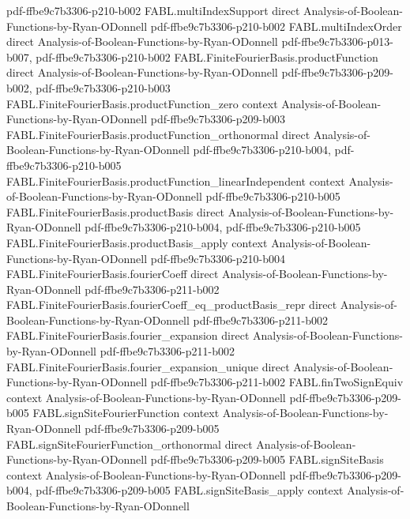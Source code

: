 \begin{theorem}
  {pdf-ffbe9c7b3306-p210-b002}
\proofstep
  {FABL.multiIndexSupport}
  {direct}
  {Analysis-of-Boolean-Functions-by-Ryan-ODonnell}
  {pdf-ffbe9c7b3306-p210-b002}
\proofstep
  {FABL.multiIndexOrder}
  {direct}
  {Analysis-of-Boolean-Functions-by-Ryan-ODonnell}
  {pdf-ffbe9c7b3306-p013-b007,
    pdf-ffbe9c7b3306-p210-b002}
\proofstep
  {FABL.FiniteFourierBasis.productFunction}
  {direct}
  {Analysis-of-Boolean-Functions-by-Ryan-ODonnell}
  {pdf-ffbe9c7b3306-p209-b002,
    pdf-ffbe9c7b3306-p210-b003}
\proofstep
  {FABL.FiniteFourierBasis.productFunction_zero}
  {context}
  {Analysis-of-Boolean-Functions-by-Ryan-ODonnell}
  {pdf-ffbe9c7b3306-p209-b003}
\proofstep
  {FABL.FiniteFourierBasis.productFunction_orthonormal}
  {direct}
  {Analysis-of-Boolean-Functions-by-Ryan-ODonnell}
  {pdf-ffbe9c7b3306-p210-b004,
    pdf-ffbe9c7b3306-p210-b005}
\proofstep
  {FABL.FiniteFourierBasis.productFunction_linearIndependent}
  {context}
  {Analysis-of-Boolean-Functions-by-Ryan-ODonnell}
  {pdf-ffbe9c7b3306-p210-b005}
\proofstep
  {FABL.FiniteFourierBasis.productBasis}
  {direct}
  {Analysis-of-Boolean-Functions-by-Ryan-ODonnell}
  {pdf-ffbe9c7b3306-p210-b004,
    pdf-ffbe9c7b3306-p210-b005}
\proofstep
  {FABL.FiniteFourierBasis.productBasis_apply}
  {context}
  {Analysis-of-Boolean-Functions-by-Ryan-ODonnell}
  {pdf-ffbe9c7b3306-p210-b004}
\proofstep
  {FABL.FiniteFourierBasis.fourierCoeff}
  {direct}
  {Analysis-of-Boolean-Functions-by-Ryan-ODonnell}
  {pdf-ffbe9c7b3306-p211-b002}
\proofstep
  {FABL.FiniteFourierBasis.fourierCoeff_eq_productBasis_repr}
  {direct}
  {Analysis-of-Boolean-Functions-by-Ryan-ODonnell}
  {pdf-ffbe9c7b3306-p211-b002}
\proofstep
  {FABL.FiniteFourierBasis.fourier_expansion}
  {direct}
  {Analysis-of-Boolean-Functions-by-Ryan-ODonnell}
  {pdf-ffbe9c7b3306-p211-b002}
\proofstep
  {FABL.FiniteFourierBasis.fourier_expansion_unique}
  {direct}
  {Analysis-of-Boolean-Functions-by-Ryan-ODonnell}
  {pdf-ffbe9c7b3306-p211-b002}
\proofstep
  {FABL.finTwoSignEquiv}
  {context}
  {Analysis-of-Boolean-Functions-by-Ryan-ODonnell}
  {pdf-ffbe9c7b3306-p209-b005}
\proofstep
  {FABL.signSiteFourierFunction}
  {context}
  {Analysis-of-Boolean-Functions-by-Ryan-ODonnell}
  {pdf-ffbe9c7b3306-p209-b005}
\proofstep
  {FABL.signSiteFourierFunction_orthonormal}
  {direct}
  {Analysis-of-Boolean-Functions-by-Ryan-ODonnell}
  {pdf-ffbe9c7b3306-p209-b005}
\proofstep
  {FABL.signSiteBasis}
  {context}
  {Analysis-of-Boolean-Functions-by-Ryan-ODonnell}
  {pdf-ffbe9c7b3306-p209-b004,
    pdf-ffbe9c7b3306-p209-b005}
\proofstep
  {FABL.signSiteBasis_apply}
  {context}
  {Analysis-of-Boolean-Functions-by-Ryan-ODonnell}

\end{theorem}
